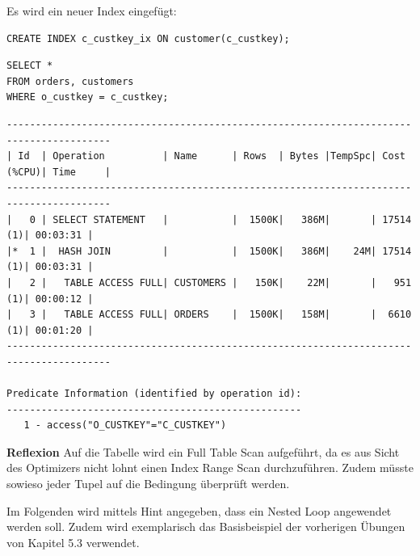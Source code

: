 \documentclass[10pt]{article}
\begin{document}
Es wird ein neuer Index eingefügt:
\begin{lstlisting}[style=sql]
CREATE INDEX c_custkey_ix ON customer(c_custkey);
\end{lstlisting}
\begin{lstlisting}[style=sql]
SELECT *
FROM orders, customers
WHERE o_custkey = c_custkey;
\end{lstlisting}
\begin{lstlisting}[style=queryexecutionplan]
----------------------------------------------------------------------------------------
| Id  | Operation          | Name      | Rows  | Bytes |TempSpc| Cost (%CPU)| Time     |
----------------------------------------------------------------------------------------
|   0 | SELECT STATEMENT   |           |  1500K|   386M|       | 17514   (1)| 00:03:31 |
|*  1 |  HASH JOIN         |           |  1500K|   386M|    24M| 17514   (1)| 00:03:31 |
|   2 |   TABLE ACCESS FULL| CUSTOMERS |   150K|    22M|       |   951   (1)| 00:00:12 |
|   3 |   TABLE ACCESS FULL| ORDERS    |  1500K|   158M|       |  6610   (1)| 00:01:20 |
----------------------------------------------------------------------------------------
 
Predicate Information (identified by operation id):
---------------------------------------------------
   1 - access("O_CUSTKEY"="C_CUSTKEY")
\end{lstlisting}
\textbf{Reflexion} \newline
Auf die Tabelle wird ein Full Table Scan aufgeführt, da es aus Sicht des Optimizers nicht 
lohnt einen Index Range Scan durchzuführen. Zudem müsste sowieso jeder Tupel auf die Bedingung 
überprüft werden. 

Im Folgenden wird mittels Hint angegeben, dass ein Nested Loop angewendet werden soll.\newline
Zudem wird exemplarisch das Basisbeispiel der vorherigen Übungen von Kapitel 5.3 verwendet.\newline
\end{document}
